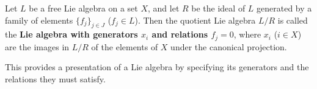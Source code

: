 Let $L$ be a free Lie algebra on a set $X$, and let $R$ be the ideal of $L$ generated by a family of elements $\{f_j\}_{j \in J}$ ($f_j \in L$). Then the quotient Lie algebra $L/R$ is called the \textbf{Lie algebra with generators $x_i$ and relations $f_j = 0$}, where $x_i$ ($i \in X$) are the images in $L/R$ of the elements of $X$ under the canonical projection.

This provides a presentation of a Lie algebra by specifying its generators and the relations they must satisfy.
